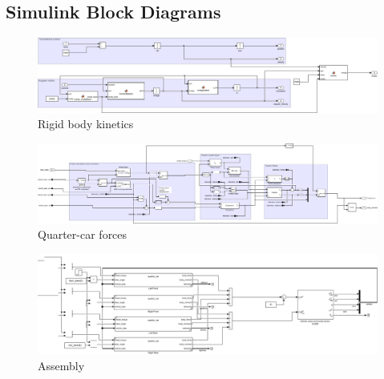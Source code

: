 \documentclass[9pt]{extarticle}
\begin{document}
\begin{landscape}
\section{Simulink Block Diagrams}

\begin{figure}[H]
	\centering
	\includegraphics[width=\linewidth]{fig/rigid_body_sixdof.pdf}
	\caption{Rigid body kinetics}
\end{figure}

\begin{figure}[H]
	\centering
	\includegraphics[width=\linewidth]{fig/quarter_car_diagram.pdf}
	\caption{Quarter-car forces}
\end{figure}

\begin{figure}[H]
	\centering
	\includegraphics[width=\linewidth]{fig/vehicle_assembly.pdf}
	\caption{Assembly}
\end{figure}
	
\end{landscape}

\pagebreak
\printbibliography
\end{document}
